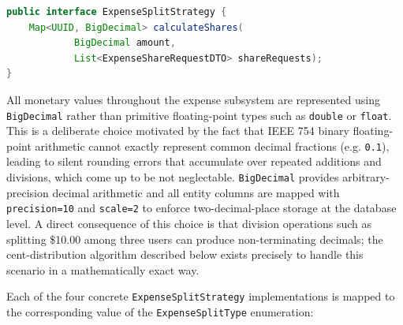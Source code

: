 \begin{lstlisting}[language=Java, caption=The ExpenseSplitStrategy Interface]
public interface ExpenseSplitStrategy {
    Map<UUID, BigDecimal> calculateShares(
            BigDecimal amount,
            List<ExpenseShareRequestDTO> shareRequests);
}
\end{lstlisting}

All monetary values throughout the expense subsystem are represented using \texttt{BigDecimal} rather than primitive floating-point types such as \texttt{double} or \texttt{float}. This is a deliberate choice motivated by the fact that IEEE 754 binary floating-point arithmetic cannot exactly represent common decimal fractions (e.g. \texttt{0.1}), leading to silent rounding errors that accumulate over repeated additions and divisions, which come up to be not neglectable. \texttt{BigDecimal} provides arbitrary-precision decimal arithmetic and all entity columns are mapped with \texttt{precision=10} and \texttt{scale=2} to enforce two-decimal-place storage at the database level. A direct consequence of this choice is that division operations such as splitting \$10.00 among three users can produce non-terminating decimals; the cent-distribution algorithm described below exists precisely to handle this scenario in a mathematically exact way.

Each of the four concrete \texttt{ExpenseSplitStrategy} implementations is mapped to the corresponding value of the \texttt{ExpenseSplitType} enumeration:

